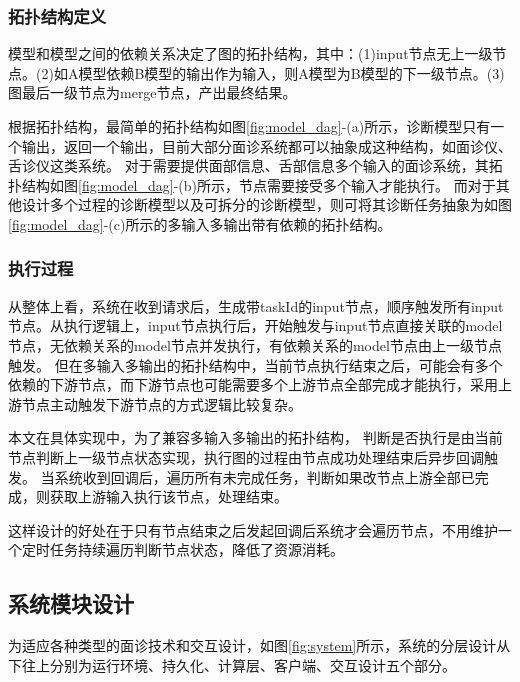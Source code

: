 \subsubsection{拓扑结构定义}
模型和模型之间的依赖关系决定了图的拓扑结构，其中：(1)input节点无上一级节点。(2)如A模型依赖B模型的输出作为输入，则A模型为B模型的下一级节点。(3)图最后一级节点为merge节点，产出最终结果。

根据拓扑结构，最简单的拓扑结构如图\ref{fig:model_dag}-(a)所示，诊断模型只有一个输出，返回一个输出，目前大部分面诊系统都可以抽象成这种结构，如面诊仪、舌诊仪这类系统。
对于需要提供面部信息、舌部信息多个输入的面诊系统，其拓扑结构如图\ref{fig:model_dag}-(b)所示，节点需要接受多个输入才能执行。
而对于其他设计多个过程的诊断模型以及可拆分的诊断模型，则可将其诊断任务抽象为如图\ref{fig:model_dag}-(c)所示的多输入多输出带有依赖的拓扑结构。

\subsubsection{执行过程}

从整体上看，系统在收到请求后，生成带taskId的input节点，顺序触发所有input节点。从执行逻辑上，input节点执行后，开始触发与input节点直接关联的model节点，无依赖关系的model节点并发执行，有依赖关系的model节点由上一级节点触发。
但在多输入多输出的拓扑结构中，当前节点执行结束之后，可能会有多个依赖的下游节点，而下游节点也可能需要多个上游节点全部完成才能执行，采用上游节点主动触发下游节点的方式逻辑比较复杂。

本文在具体实现中，为了兼容多输入多输出的拓扑结构，
判断是否执行是由当前节点判断上一级节点状态实现，执行图的过程由节点成功处理结束后异步回调触发。
当系统收到回调后，遍历所有未完成任务，判断如果改节点上游全部已完成，则获取上游输入执行该节点，处理结束。

这样设计的好处在于只有节点结束之后发起回调后系统才会遍历节点，不用维护一个定时任务持续遍历判断节点状态，降低了资源消耗。


\subsection{系统模块设计}
为适应各种类型的面诊技术和交互设计，如图\ref{fig:system}所示，系统的分层设计从下往上分别为运行环境、持久化、计算层、客户端、交互设计五个部分。

